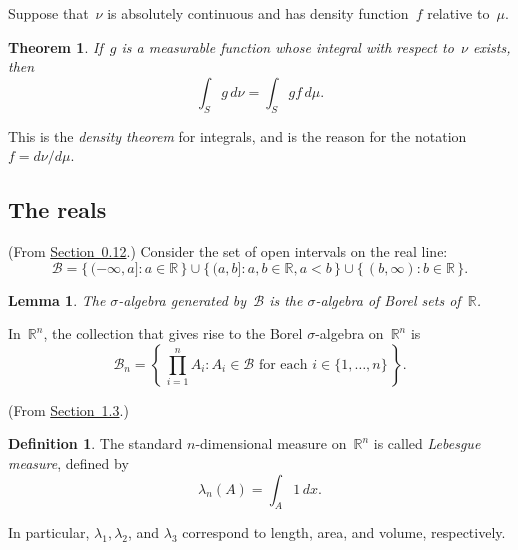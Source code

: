 \documentclass[11pt,a4paper]{article}
\newcommand\ts{\textstyle}                       %
\newcommand\mb[1]{\mathbb{#1}}                   %
\newcommand\mc[1]{\mathcal{#1}}                  %
\newtheorem{lem}{Lemma}
\newtheorem{thm}{Theorem}
\theoremstyle{definition}
\newtheorem{defn}{Definition}
\begin{document}
Suppose that~$\nu$ is absolutely continuous and has density function~$f$
relative to~$\mu$.
\begin{thm}
If~$g$ is a measurable function whose integral with respect to~$\nu$ exists,
then
\[ \int_S g\,d\nu = \int_S gf\,d\mu. \]
\end{thm}
This is the \emph{density theorem} for integrals, and is the reason for the
notation~$f = d\nu/d\mu$.

\subsection{The reals} %

(From \href{http://www.randomservices.org/random/foundations/Other.html}
{Section~0.12}.) Consider the set of open intervals on the real line:
\[ \mc{B} = \{\, (-\infty,a] : a \in \mb{R} \,\}
  \cup \{\, (a,b] : a,b \in \mb{R}, a < b \,\}
  \cup \{\, (b,\infty) : b \in \mb{R} \,\}. \]
\begin{lem}
The $\sigma$-algebra generated by~$\mc{B}$ is the $\sigma$-algebra of Borel sets
of~$\mb{R}$.
\end{lem}
In~$\mb{R}^n$, the collection that gives rise to the Borel $\sigma$-algebra
on~$\mb{R}^n$ is
\[ \mc{B}_n = \left\{\, \ts\prod_{i=1}^n A_i
  : A_i \in \mc{B} \text{ for each } i \in \{1,\dots,n\} \,\right\}. \]

(From \href{http://www.randomservices.org/random/prob/Probability.html}
{Section~1.3}.)
\begin{defn}
The standard $n$-dimensional measure on~$\mb{R}^n$ is called \emph{Lebesgue
measure}, defined by
\[ \lambda_n(A) = \int_A 1\,dx. \]
\end{defn}
In particular, $\lambda_1, \lambda_2$, and $\lambda_3$ correspond to length,
area, and volume, respectively.
\end{document}

